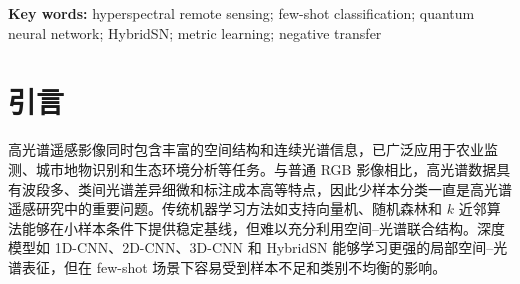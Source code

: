 \documentclass[UTF8,a4paper,zihao=-4,fontset=fandol]{ctexart}
\begin{document}
\begin{abstract}
Hyperspectral image classification under limited annotations remains challenging because of spectral similarity between classes, intra-class variability, and strong spatial dependence. Hybrid quantum-classical neural networks have recently been explored as potential models for high-dimensional feature mapping, but their effectiveness over strong classical baselines remains unclear. This paper investigates quantum neural network (QNN) spectral branches for few-shot hyperspectral image classification on Indian Pines, Pavia University, and Salinas. We compare HybridSN-small with multiple QNN variants under 5-shot and 10-shot protocols, and further include lightweight strong remote-sensing baselines inspired by SSRN, SpectralFormer, and DBDA. The results show that directly using a QNN as a classifier head is ineffective, whereas a spectral-side QNN branch combined with gated fusion and prototype or supervised contrastive learning yields stable or marginal gains on Pavia University 5/10-shot, Salinas 5-shot, and Indian Pines 10-shot. Strong-baseline screening shows that DBDA-lite outperforms the current QNN variant on Pavia University 10-shot, while the QNN variant still achieves the highest Macro-F1 on Salinas 10-shot among the evaluated lightweight strong baselines. These findings indicate that QNN gains are conditional rather than universal, and QNN branches should be treated as conditional spectral regularizers instead of general replacements for classical hyperspectral classifiers.
\end{abstract}

\noindent\textbf{Key words:} hyperspectral remote sensing; few-shot classification; quantum neural network; HybridSN; metric learning; negative transfer

\section{引言}

高光谱遥感影像同时包含丰富的空间结构和连续光谱信息，已广泛应用于农业监测、城市地物识别和生态环境分析等任务。与普通 RGB 影像相比，高光谱数据具有波段多、类间光谱差异细微和标注成本高等特点，因此少样本分类一直是高光谱遥感研究中的重要问题。传统机器学习方法如支持向量机、随机森林和 $k$ 近邻算法能够在小样本条件下提供稳定基线\cite{camps2005svm}，但难以充分利用空间--光谱联合结构。深度模型如 1D-CNN、2D-CNN、3D-CNN 和 HybridSN 能够学习更强的局部空间--光谱表征\cite{chen2016deep,roy2020hybridsn,li2018spectralspatial}，但在 few-shot 场景下容易受到样本不足和类别不均衡的影响。
\end{document}
